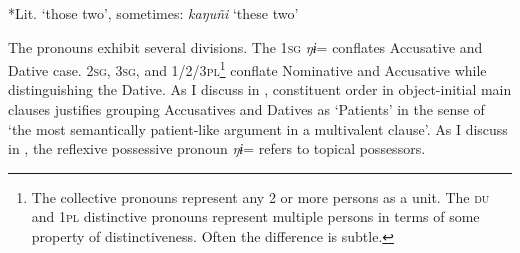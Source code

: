 \documentclass[output=paper]{langscibook}
\begin{document}
\begin{table}
\caption{Pronouns in Chini}
\label{tab:brooks:1}
*Lit. `those two', sometimes:  \textit{kaŋuñi} `these two'
\end{table}

The pronouns exhibit several divisions. The 1\textsc{sg} \textit{ŋɨ}= conflates Accusative and Dative case. 2\textsc{sg}, 3\textsc{sg}, and 1/2/3\textsc{pl}\footnote{The collective pronouns represent any 2 or more persons as a unit. The \textsc{du} and 1\textsc{pl} distinctive pronouns represent multiple persons in terms of some property of distinctiveness. Often the difference is subtle.} conflate Nominative and Accusative while distinguishing the Dative. As I discuss in , constituent order in object-initial main clauses justifies grouping Accusatives and Datives as ‘Patients’ in the sense of ‘the most semantically patient-like argument in a multivalent clause’. As I discuss in , the reflexive possessive pronoun \textit{ŋɨ}= refers to topical possessors.
\end{document}
